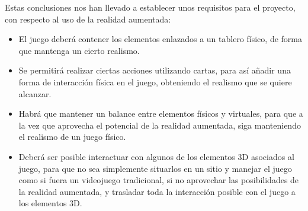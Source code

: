 \begin{itemize}
\begin{itemize}
\begin{itemize}
\end{itemize}

Estas conclusiones nos han llevado a establecer unos requisitos para el proyecto, con respecto al uso de la realidad aumentada:

\begin{itemize}
  \item El juego deberá contener los elementos enlazados a un tablero físico, de forma que mantenga un cierto realismo.

  \item Se permitirá realizar ciertas acciones utilizando cartas, para así añadir una forma de interacción física en el juego, obteniendo el realismo que se quiere alcanzar.

  \item Habrá que mantener un balance entre elementos físicos y virtuales, para que a la vez que aprovecha el potencial de la realidad aumentada, siga manteniendo el realismo de un juego físico.

  \item Deberá ser posible interactuar con algunos de los elementos 3D asociados al juego, para que no sea simplemente situarlos en un sitio y manejar el juego como si fuera un videojuego tradicional, si no aprovechar las posibilidades de la realidad aumentada, y trasladar toda la interacción posible con el juego a los elementos 3D.

\end{itemize}
